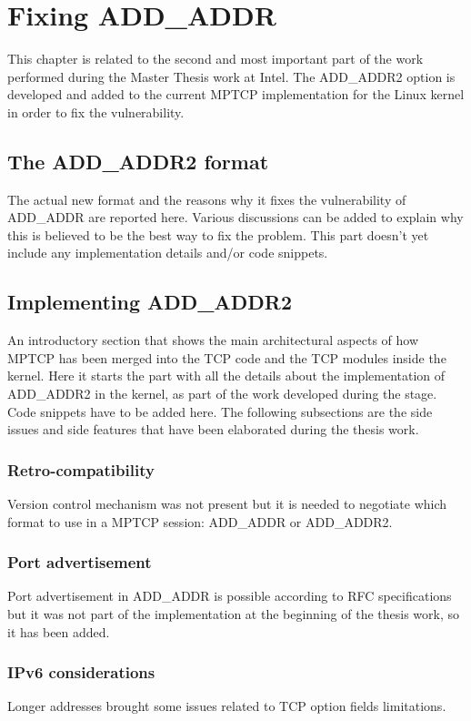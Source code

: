 \chapter{Fixing ADD\_ADDR}
\label{chap:addaddr2}

This chapter is related to the second and most important part of the work performed during the Master Thesis work at Intel. The ADD\_ADDR2 option is developed and added to the current MPTCP implementation for the Linux kernel in order to fix the vulnerability.

\section{The ADD\_ADDR2 format}
The actual new format and the reasons why it fixes the vulnerability of ADD\_ADDR are reported here. Various discussions can be added to explain why this is believed to be the best way to fix the problem. This part doesn't yet include any implementation details and/or code snippets.

\section{Implementing ADD\_ADDR2}
An introductory section that shows the main architectural aspects of how MPTCP has been merged into the TCP code and the TCP modules inside the kernel.
Here it starts the part with all the details about the implementation of ADD\_ADDR2 in the kernel, as part of the work developed during the stage. Code snippets have to be added here. The following subsections are the side issues and side features that have been elaborated during the thesis work.

\subsection{Retro-compatibility}
Version control mechanism was not present but it is needed to negotiate which format to use in a MPTCP session: ADD\_ADDR or ADD\_ADDR2.

\subsection{Port advertisement}
Port advertisement in ADD\_ADDR is possible according to RFC specifications but it was not part of the implementation at the beginning of the thesis work, so it has been added.

\subsection{IPv6 considerations}
Longer addresses brought some issues related to TCP option fields limitations.

